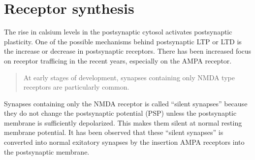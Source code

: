 


\section{Receptor synthesis}
The rise in calsium levels in the postsynaptic cytosol activates postsynaptic plasticity\cite{AMPARtrafficingArtikkel}. 
One of the possible mechanisms behind postsynaptic LTP or LTD is the increase or decrease in postsynaptic receptors. There has been increased focus on receptor trafficing in the recent years, especially on the AMPA receptor. 

\begin{quote}
At early stages of development, synapses containing only NMDA type receptors are particularly common\cite{PrinciplesOfNeuralScience4edKAP12}.
\end{quote}
Synapses containing only the NMDA receptor is called ``silent synapses'' because they do not change the postsynaptic potential (PSP) unless the postsynaptic membrane is sufficiently depolarized. 
This makes them silent at normal resting membrane potential\cite{AMPARtrafficingArtikkel}. 
It has been observed that these ``silent synapses'' is converted into normal exitatory synapses by the insertion AMPA receptors into the postsynaptic membrane\cite{AMPARtrafficingArtikkel}. 

